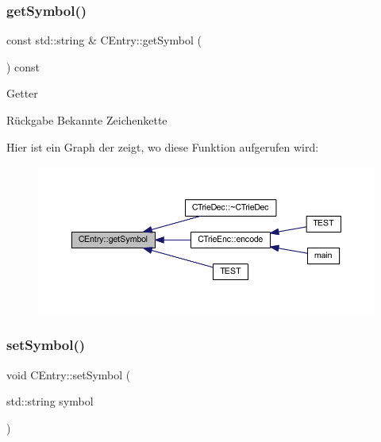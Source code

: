 \subsubsection{\texorpdfstring{get\+Symbol()}{getSymbol()}}
{\footnotesize\ttfamily const std\+::string \& C\+Entry\+::get\+Symbol (\begin{DoxyParamCaption}{ }\end{DoxyParamCaption}) const}

Getter \begin{DoxyReturn}{Rückgabe}
Bekannte Zeichenkette 
\end{DoxyReturn}
Hier ist ein Graph der zeigt, wo diese Funktion aufgerufen wird\+:
\nopagebreak
\begin{figure}[H]
\begin{center}
\leavevmode
\includegraphics[width=350pt]{class_c_entry_aede4d6e03efa3abb0ed56349edb5b86d_icgraph}
\end{center}
\end{figure}
\mbox{\label{class_c_entry_a2ac2cbee24817ff5b67e09f03a952e77}} 
\subsubsection{\texorpdfstring{set\+Symbol()}{setSymbol()}}
{\footnotesize\ttfamily void C\+Entry\+::set\+Symbol (\begin{DoxyParamCaption}\item[{std\+::string}]{symbol }\end{DoxyParamCaption})}


